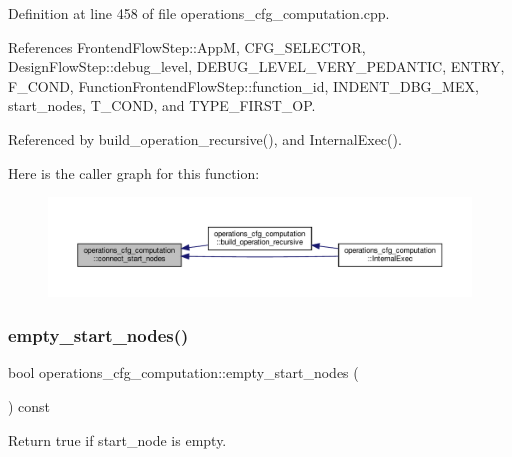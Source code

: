 Definition at line 458 of file operations\+\_\+cfg\+\_\+computation.\+cpp.



References Frontend\+Flow\+Step\+::\+AppM, C\+F\+G\+\_\+\+S\+E\+L\+E\+C\+T\+OR, Design\+Flow\+Step\+::debug\+\_\+level, D\+E\+B\+U\+G\+\_\+\+L\+E\+V\+E\+L\+\_\+\+V\+E\+R\+Y\+\_\+\+P\+E\+D\+A\+N\+T\+IC, E\+N\+T\+RY, F\+\_\+\+C\+O\+ND, Function\+Frontend\+Flow\+Step\+::function\+\_\+id, I\+N\+D\+E\+N\+T\+\_\+\+D\+B\+G\+\_\+\+M\+EX, start\+\_\+nodes, T\+\_\+\+C\+O\+ND, and T\+Y\+P\+E\+\_\+\+F\+I\+R\+S\+T\+\_\+\+OP.



Referenced by build\+\_\+operation\+\_\+recursive(), and Internal\+Exec().

Here is the caller graph for this function\+:
\nopagebreak
\begin{figure}[H]
\begin{center}
\leavevmode
\includegraphics[width=350pt]{d0/d11/classoperations__cfg__computation_a10a94b4065c3e5bf12d59b78873f6dce_icgraph}
\end{center}
\end{figure}
\mbox{\label{classoperations__cfg__computation_a3565d9d33d44fce47a2fde3d39392f4b}} 
\subsubsection{\texorpdfstring{empty\+\_\+start\+\_\+nodes()}{empty\_start\_nodes()}}
{\footnotesize\ttfamily bool operations\+\_\+cfg\+\_\+computation\+::empty\+\_\+start\+\_\+nodes (\begin{DoxyParamCaption}{ }\end{DoxyParamCaption}) const\hspace{0.3cm}{\ttfamily [private]}}



Return true if start\+\_\+node is empty. 

